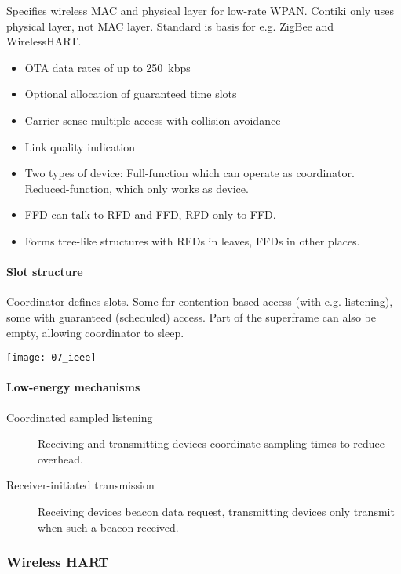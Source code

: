 Specifies wireless MAC and physical layer for low-rate WPAN. Contiki only uses
physical layer, not MAC layer. Standard is basis for e.g. ZigBee and WirelessHART.

\begin{itemize}
		\item OTA data rates of up to \SI{250}{kbps}
		\item Optional allocation of guaranteed time slots
		\item Carrier-sense multiple access with collision avoidance
		\item Link quality indication
		\item Two types of device: Full-function which can operate as
				coordinator. Reduced-function, which only works as device.
		\item FFD can talk to RFD and FFD, RFD only to FFD.
		\item Forms tree-like structures with RFDs in leaves, FFDs in other
				places.
\end{itemize}

\paragraph{Slot structure}

Coordinator defines slots. Some for contention-based access (with e.g.
listening), some with guaranteed (scheduled) access. Part of the superframe can
also be empty, allowing coordinator to sleep.

\texttt{[image: 07\_ieee]}

\paragraph{Low-energy mechanisms}

\begin{description}
		\item[Coordinated sampled listening] Receiving and transmitting devices
				coordinate sampling times to reduce overhead.
		\item[Receiver-initiated transmission] Receiving devices beacon data
				request, transmitting devices only transmit when such a beacon
				received.
\end{description}

\subsubsection{Wireless HART}

